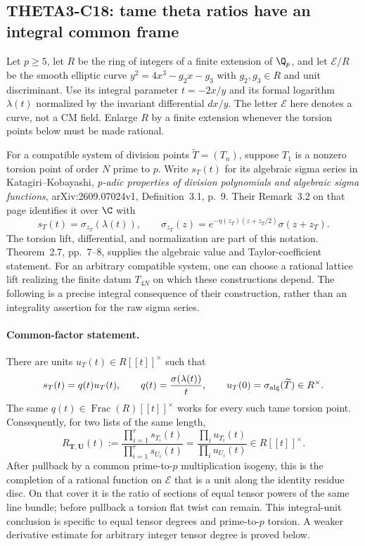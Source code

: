 \subsection{THETA3-C18: tame theta ratios have an integral common frame}\label{C18}

Let $p\geq5$, let $R$ be the ring of integers of a finite extension of
$\Q_p$, and let $\mathcal E/R$ be the smooth elliptic curve
$y^2=4x^3-g_2x-g_3$ with $g_2,g_3\in R$ and unit discriminant.
Use its integral parameter $t=-2x/y$ and its formal logarithm
$\lambda(t)$ normalized by the invariant differential $dx/y$.
The letter $\mathcal E$ here denotes a curve, not a CM field.
Enlarge $R$ by a finite extension whenever the torsion points below
must be made rational.

For a compatible system of division points $\widetilde T=(T_n)$,
suppose $T_1$ is a nonzero torsion point of order $N$ prime to $p$.
Write $s_T(t)$ for its algebraic sigma series in
Katagiri--Kobayashi, \emph{p-adic properties of division polynomials
and algebraic sigma functions}, arXiv:2609.07024v1,
Definition~3.1, p.~9. Their Remark~3.2 on that page identifies it over
$\C$ with
\[
 s_T(t)=\sigma_{z_T}(\lambda(t)),\qquad
 \sigma_{z_T}(z)=
 e^{-\eta(z_T)(z+z_T/2)}\sigma(z+z_T).
\]
The torsion lift, differential, and normalization are part of this
notation. Theorem~2.7, pp.~7--8, supplies the algebraic value and
Taylor-coefficient statement. For an arbitrary compatible system,
one can choose a rational lattice lift realizing the finite datum
$T_{4N}$ on which these constructions depend.
The following is a precise integral consequence of their
construction, rather than an integrality assertion for the raw sigma
series.

\paragraph{Common-factor statement.}
There are units $u_T(t)\in R[[t]]^\times$ such that
\begin{equation}\label{C18-factor}
 s_T(t)=q(t)u_T(t),\qquad
 q(t)=\frac{\sigma(\lambda(t))}{t},\qquad
 u_T(0)=\sigma_{\rm alg}(\widetilde T)\in R^\times.
\end{equation}
The same $q(t)\in\operatorname{Frac}(R)[[t]]^\times$ works for every
such tame torsion point. Consequently, for two lists of the same
length,
\begin{equation}\label{C18-ratio}
 R_{\mathbf T,\mathbf U}(t):=
 \frac{\prod_{i=1}^r s_{T_i}(t)}
      {\prod_{i=1}^r s_{U_i}(t)}
       =\frac{\prod_i u_{T_i}(t)}{\prod_i u_{U_i}(t)}
       \in R[[t]]^\times.
\end{equation}
After pullback by a common prime-to-$p$ multiplication isogeny,
this is the completion of a rational function on
$\mathcal E$ that is a unit along the identity residue disc.
On that cover it is the ratio of sections of equal tensor powers
of the same line bundle; before pullback a torsion flat twist can
remain. This integral-unit conclusion is specific to equal tensor
degrees and prime-to-$p$ torsion. A weaker derivative estimate for
arbitrary integer tensor degree is proved below.

